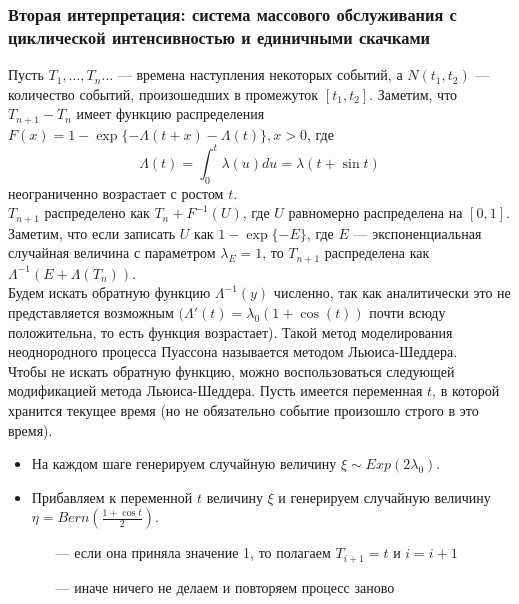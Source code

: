 \documentclass[11pt]{article}
\numberwithin{equation}{section}
\begin{document}
\subsubsection{Вторая интерпретация: система массового обслуживания с циклической интенсивностью и единичными скачками}
Пусть $T_1,\dots,T_n\dots$ --- времена наступления некоторых событий, а $N(t_1,t_2)$ --- количество событий, произошедших в промежуток $[t_1,t_2]$. Заметим, что $T_{n+1} - T_n$ имеет функцию распределения $F(x) = 1 - \exp\{-\Lambda(t + x) - \Lambda(t)\}, x > 0$, где 
\[\Lambda(t) = \int_{0}^{t}\lambda(u)du = \lambda(t + \sin t)\]
неограниченно возрастает с ростом $t$. \\
$T_{n+1}$ распределено как $T_n + F^{-1}(U)$, где $U$ равномерно распределена на $[0,1]$. Заметим, что если записать $U$ как $1-\exp\{-E\}$, где $E$ --- экспоненциальная случайная величина с параметром $\lambda_E = 1$, то $T_{n+1}$ распределена как $\Lambda^{-1}(E + \Lambda(T_n)).$\\
Будем искать обратную функцию $\Lambda^{-1}(y)$ численно, так как аналитически это не представляется возможным $(\Lambda'(t) = \lambda_0(1 + \cos (t))$ почти всюду положительна, то есть функция возрастает). Такой метод моделирования неоднородного процесса Пуассона называется методом Льюиса-Шеддера.\\
Чтобы не искать обратную функцию, можно воспользоваться следующей модификацией метода Льюиса-Шеддера. Пусть имеется переменная $t$, в которой хранится текущее время (но не обязательно событие произошло строго в это время).
\begin{itemize}
	\item На каждом шаге генерируем случайную величину $\xi \sim Exp(2\lambda_0)$.
	\item Прибавляем к переменной $t$ величину $\xi$ и генерируем случайную величину $\eta = Bern(\frac{1 + \cos t}{2}).$
	\begin{itemize}
		\item [---] если она приняла значение 1, то полагаем $T_{i+1} = t$ и $i = i+1$
		\item [---] иначе ничего не делаем и повторяем процесс заново
	\end{itemize}
\end{itemize}
 
\end{document}
